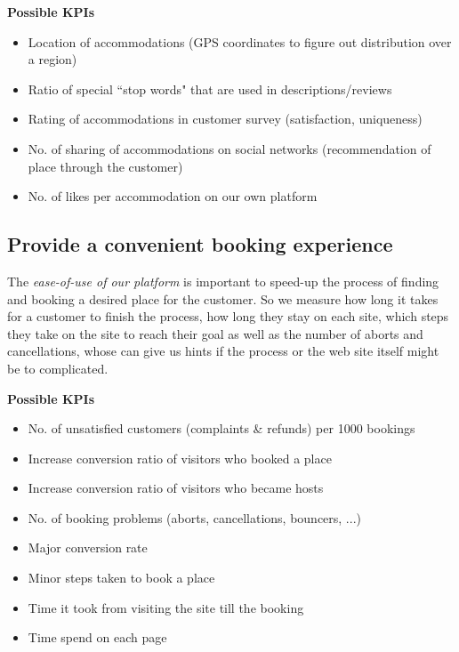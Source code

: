 \begin{description}
	\item \textbf{Possible KPIs}
	\begin{itemize}
    	\item Location of accommodations (GPS coordinates to figure out distribution over a region)
        \item Ratio of special ``stop words" that are used in descriptions/reviews
        \item Rating of accommodations in customer survey (satisfaction, uniqueness)
        \item No. of sharing of accommodations on social networks (recommendation of place through the customer)
        \item No. of likes per accommodation on our own platform
    \end{itemize}
\end{description}


\subsection{Provide a convenient booking experience}
The \textit{ease-of-use of our platform} is important to speed-up the process of finding and booking a desired place for the customer. So we measure how long it takes for a customer to finish the process, how long they stay on each site, which steps they take on the site to reach their goal as well as the number of aborts and cancellations, whose can give us hints if the process or the web site itself might be to complicated.

\begin{description}
	\item \textbf{Possible KPIs}
	\begin{itemize}
    	\item No. of unsatisfied customers (complaints \& refunds) per 1000 bookings
        \item Increase conversion ratio of visitors who booked a place
        \item Increase conversion ratio of visitors who became hosts
        \item No. of booking problems (aborts, cancellations, bouncers, ...)
        \item Major conversion rate
        \item Minor steps taken to book a place
        \item Time it took from visiting the site till the booking
        \item Time spend on each page
    \end{itemize}
\end{description}

